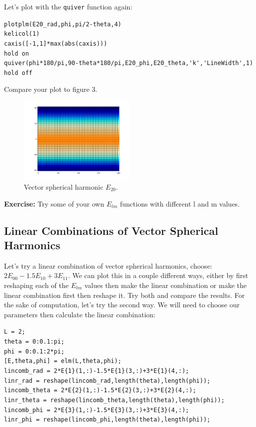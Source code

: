 \documentclass[11pt]{article}
\begin{document}
Let's plot with the \verb|quiver| function again:

\verb|plotplm(E20_rad,phi,pi/2-theta,4)|\\
\verb|kelicol(1)|\\
\verb|caxis([-1,1]*max(abs(caxis)))|\\
\verb|hold on|\\
\verb|quiver(phi*180/pi,90-theta*180/pi,E20_phi,E20_theta,'k','LineWidth',1)|\\
\verb|hold off|

Compare your plot to figure 3.

\begin{figure}[H]
  \centering
  \includegraphics[width=0.5\textwidth]{figures_Rep2/E20_quiver.png}  
  \caption{Vector spherical harmonic $E_{20}$.}
\label{E7}
\end{figure}

\textbf{Exercise:} Try some of your own $E_{lm}$ functions with different l and m values.

\subsection{Linear Combinations of Vector Spherical Harmonics}

Let's try a linear combination of vector spherical harmonics, choose: $2E_{00}-1.5E_{10}+3E_{11}$.  We can plot this in a couple different ways, either by first reshaping each of the $E_{lm}$ values then make the linear combination or make the linear combination first then reshape it.  Try both and compare the results.  For the sake of computation, let's try the second way.  We will need to choose our parameters then calculate the linear combination:

\verb|L = 2;|\\
\verb|theta = 0:0.1:pi;|\\
\verb|phi = 0:0.1:2*pi;|\\
\verb|[E,theta,phi] = elm(L,theta,phi);|\\
\verb|lincomb_rad = 2*E{1}(1,:)-1.5*E{1}(3,:)+3*E{1}(4,:);|\\
\verb|linr_rad = reshape(lincomb_rad,length(theta),length(phi));|\\
\verb|lincomb_theta = 2*E{2}(1,:)-1.5*E{2}(3,:)+3*E{2}(4,:);|\\
\verb|linr_theta = reshape(lincomb_theta,length(theta),length(phi));|\\
\verb|lincomb_phi = 2*E{3}(1,:)-1.5*E{3}(3,:)+3*E{3}(4,:);|\\
\verb|linr_phi = reshape(lincomb_phi,length(theta),length(phi));|\\
\end{document}
